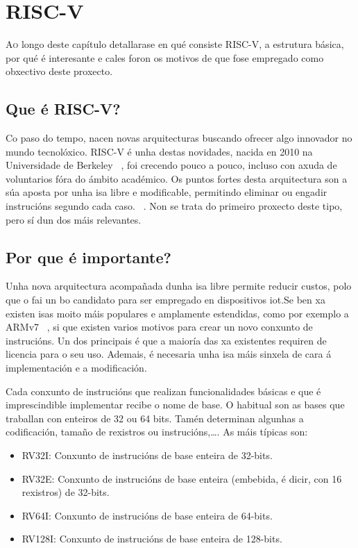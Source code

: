 \chapter{RISC-V}
\label{chap:riscv}

\lettrine{A}{o} longo deste capítulo detallarase en qué consiste RISC-V, a estrutura básica, por qué é interesante e cales foron os motivos de que fose empregado como obxectivo deste proxecto.

\section{Que é RISC-V?}\label{sec:que_riscv}
Co paso do tempo, nacen novas arquitecturas buscando ofrecer algo innovador no mundo tecnolóxico. RISC-V é unha destas novidades, nacida en 2010 na Universidade de Berkeley ~\cite{WikipediaRISCV}, foi crecendo pouco a pouco, incluso con axuda de voluntarios fóra do ámbito académico. Os puntos fortes desta arquitectura son a súa aposta por unha \acrfull{isa} libre e modificable, permitindo eliminar ou engadir instrucións segundo cada caso. ~\cite{RISCV_IoT}. Non se trata do primeiro proxecto deste tipo, pero sí dun dos máis relevantes. 

\section{Por que é importante?}\label{sec:imp_riscv}
Unha nova arquitectura acompañada dunha \acrshort{isa} libre permite reducir custos, polo que o fai un bo candidato para ser empregado en dispositivos \acrshort{iot}.Se ben xa existen \acrshort{isa}s moito máis populares e amplamente estendidas, como por exemplo a ARMv7 ~\cite{Waterman:EECS-2016-1}, si que existen varios motivos para crear un novo conxunto de instrucións. Un dos principais é que a maioría das xa existentes requiren de licencia para o seu uso. Ademais, é necesaria unha \acrshort{isa} máis sinxela de cara á implementación e a modificación. 

Cada conxunto de instrucións que realizan funcionalidades básicas e que é imprescindible implementar recibe o nome de base. O habitual son as bases que traballan con enteiros de 32 ou 64 bits. Tamén determinan algunhas a codificación, tamaño de rexistros ou instrucións,\dots. As máis típicas son: 
\begin{itemize}
    \item RV32I: Conxunto de instrucións de base enteira de 32-bits.
    \item RV32E: Conxunto de instrucións de base enteira (embebida, é dicir, con 16 rexistros) de 32-bits.
    \item RV64I: Conxunto de instrucións de base enteira de 64-bits.
    \item RV128I: Conxunto de instrucións de base enteira de 128-bits.
\end{itemize}

